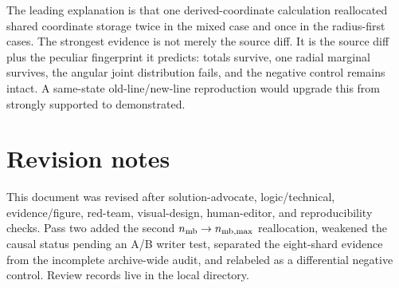 \documentclass[11pt]{article}
\begin{document}
\bottomline The leading explanation is that one derived-coordinate calculation
reallocated shared coordinate storage twice in the mixed 
case and once in the radius-first cases. The strongest evidence is not merely
the source diff. It is the source diff plus the peculiar fingerprint it
predicts: totals survive, one radial marginal survives, the angular joint
distribution fails, and the negative control remains intact. A same-state
old-line/new-line reproduction would upgrade this from strongly supported to
demonstrated.

\appendix
\section{Revision notes}

This document was revised after solution-advocate, logic/technical,
evidence/figure, red-team, visual-design, human-editor, and reproducibility
checks. Pass two added the second \(n_{\rm mb}\rightarrow n_{\rm mb,max}\)
reallocation, weakened the causal status pending an A/B writer test, separated
the eight-shard evidence from the incomplete archive-wide audit, and relabeled
 as a differential negative control. Review records live in
the local  directory.
\end{document}
